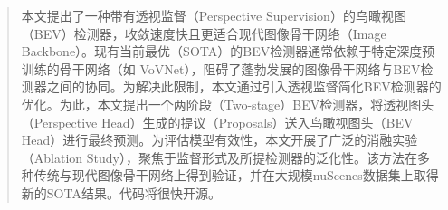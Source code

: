 \begin{abstract}
本文提出了一种带有透视监督（Perspective Supervision）的鸟瞰视图（BEV）检测器，收敛速度快且更适合现代图像骨干网络（Image Backbone）。现有当前最优（SOTA）的BEV检测器通常依赖于特定深度预训练的骨干网络（如 VoVNet），阻碍了蓬勃发展的图像骨干网络与BEV检测器之间的协同。为解决此限制，本文通过引入透视监督简化BEV检测器的优化。为此，本文提出一个两阶段（Two-stage）BEV检测器，将透视图头（Perspective Head）生成的提议（Proposals）送入鸟瞰视图头（BEV Head）进行最终预测。为评估模型有效性，本文开展了广泛的消融实验（Ablation Study），聚焦于监督形式及所提检测器的泛化性。该方法在多种传统与现代图像骨干网络上得到验证，并在大规模nuScenes数据集上取得新的SOTA结果。代码将很快开源。
\end{abstract}
